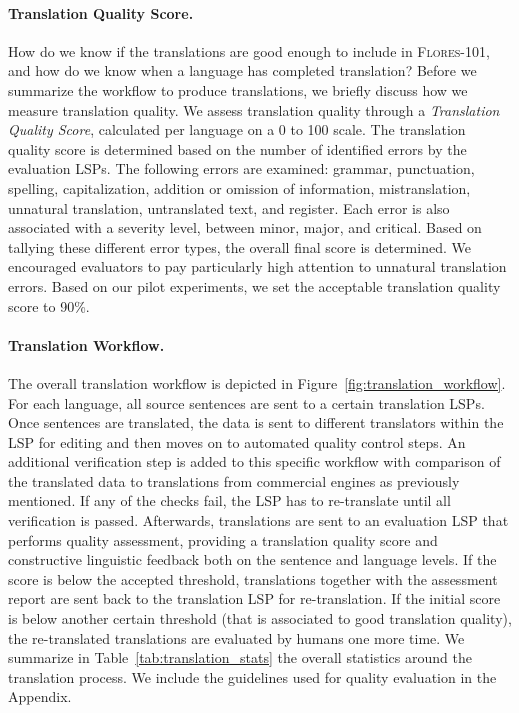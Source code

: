 \paragraph{Translation Quality Score.} How do we know if the translations are good enough to include in \textsc{Flores-101}, and how do we know when a language has completed translation? Before we summarize the workflow to produce translations, we briefly discuss how we measure translation quality. We assess translation quality through a \textit{Translation Quality Score}, calculated per language on a 0 to 100 scale. The translation quality score is determined based on the number of identified errors by the evaluation LSPs. The following errors are examined: grammar, punctuation, spelling, capitalization, addition or omission of information, mistranslation, unnatural translation, untranslated text, and register. Each error is also associated with a severity level, between minor, major, and critical. Based on tallying these different error types, the overall final score is determined. We encouraged evaluators to pay particularly high attention to unnatural translation errors. Based on our pilot experiments, we set the acceptable translation quality score to 90\%. 

\paragraph{Translation Workflow.} The overall translation workflow is depicted in Figure~\ref{fig:translation_workflow}. 
For each language, all source sentences are sent to a certain translation LSPs. Once sentences are translated, the data is sent to different translators within the LSP for editing and then moves on to automated quality control steps. An additional verification step is added to this specific workflow with comparison of the translated data to translations from commercial engines as previously mentioned. If any of the checks fail, the LSP has to re-translate until all verification is passed. Afterwards, translations are sent to an evaluation LSP that performs quality assessment, providing a translation quality score and constructive linguistic feedback both on the sentence and language levels. If the score is below the accepted threshold, translations together with the assessment report are sent back to the translation LSP for re-translation. If the initial score is below another certain threshold (that is associated to good translation quality), the re-translated translations are evaluated by humans one more time. We summarize in Table~\ref{tab:translation_stats} the overall statistics around the translation process. We include the guidelines used for quality evaluation in the Appendix.

